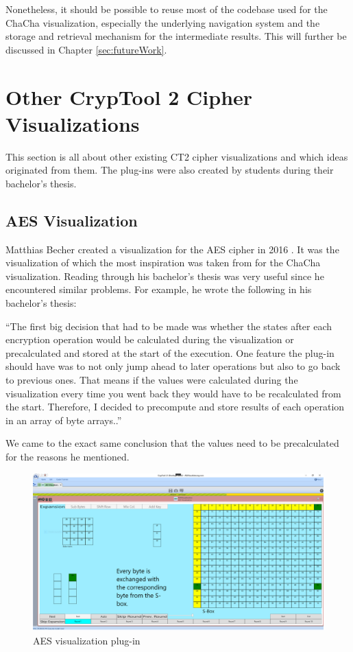 Nonetheless, it should be possible to reuse most of the codebase used for the ChaCha visualization, especially the underlying navigation system and the storage and retrieval mechanism for the intermediate results. This will further be discussed in Chapter \ref{sec:futureWork}.

\section{Other CrypTool 2 Cipher Visualizations}
\label{sec:otherCT2CipherVisualizations}

This section is all about other existing CT2 cipher visualizations and which ideas originated from them. The plug-ins were also created by students during their bachelor's thesis.

\subsection{AES Visualization}
\label{sec:aesVisualization}

Matthias Becher created a visualization for the AES cipher in 2016 \cite{aesthesis}. It was the visualization of which the most inspiration was taken from for the ChaCha visualization. Reading through his bachelor's thesis was very useful since he encountered similar problems. For example, he wrote the following in his bachelor's thesis:

``The first big decision that had to be made was whether the states after each encryption operation would be calculated during the visualization or precalculated and stored at the start of the execution. One feature the plug-in should have was to not only jump ahead to later operations but also to go back to previous ones. That means if the values were calculated during the visualization every time you went back they would have to be recalculated from the start. Therefore, I decided to precompute and store results of each operation in an array of byte arrays..'' \cite{aesthesis}

We came to the exact same conclusion that the values need to be precalculated for the reasons he mentioned.

\begin{figure}
\centering
\includegraphics[width=\textwidth]{figures/ct2/aes.png}
\caption{AES visualization plug-in}
\label{fig:aes}
\end{figure}

